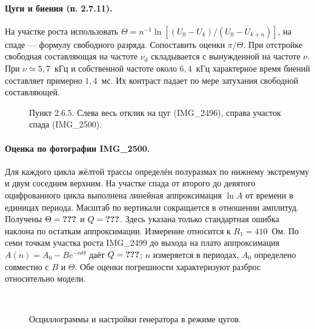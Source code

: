\documentclass[a4paper,12pt]{article}
\makeatletter
\newcommand{\qq}{\textbf{???}}
\newcommand{\res}[1]{\ifcsname res@#1\endcsname\ensuremath{\csname res@#1\endcsname}\else\qq\fi}
\makeatother
\begin{document}
\paragraph{Цуги и биения (п. 2.7.11).} На участке роста использовать
$\Theta=n^{-1}\ln[(U_0-U_k)/(U_0-U_{k+n})]$, на спаде --- формулу свободного разряда. Сопоставить оценки $\pi/\Theta$. При отстройке свободная составляющая на частоте $\nu_d$ складывается с вынужденной на частоте $\nu$. При $\nu\simeq5{,}7$~кГц и собственной частоте около $6{,}4$~кГц характерное время биений составляет примерно $1{,}4$~мс. Их контраст падает по мере затухания свободной составляющей.
\begin{figure}[H]\centering{}\hfill{}\caption{Пункт 2.6.5. Слева весь отклик на цуг (IMG\_2496), справа участок спада (IMG\_2500).}\end{figure}
\paragraph{Оценка по фотографии IMG\_2500.} Для каждого цикла жёлтой трассы определён полуразмах по нижнему экстремуму и двум соседним верхним. На участке спада от второго до девятого оцифрованного цикла выполнена линейная аппроксимация $\ln A$ от времени в единицах периода. Масштаб по вертикали сокращается в отношении амплитуд. Получены $\Theta=\res{photoTheta}$ и $Q=\res{fall1}$. Здесь указана только стандартная ошибка наклона по остаткам аппроксимации. Измерение относится к $R_1=410$~Ом. По семи точкам участка роста IMG\_2499 до выхода на плато аппроксимация $A(n)=A_0-Be^{-n\Theta}$ даёт $Q=\res{rise1}$; $n$ измеряется в периодах, $A_0$ определено совместно с $B$ и $\Theta$. Обе оценки погрешности характеризуют разброс относительно модели.
\begin{figure}[H]\centering{}\hfill{}\\[3mm]
\hfill{}
\caption{Осциллограммы и настройки генератора в режиме цугов.}\end{figure}
\end{document}
